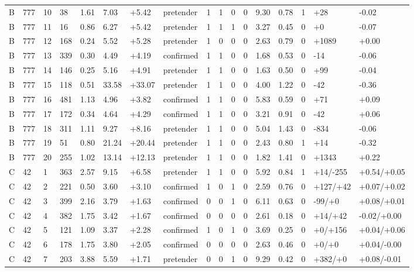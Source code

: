 \documentclass[11pt,a4paper]{article}
\begin{document}
{\begin{longtable}[]{@{}lllllllllllllllll@{}}
B & 777 & 10 & 38 & 1.61 & 7.03 & +5.42 & pretender & 1 & 1 & 0 & 0 & 9.30 & 0.78 & 1 & +28 & -0.02 \\
B & 777 & 11 & 16 & 0.86 & 6.27 & +5.42 & pretender & 1 & 1 & 1 & 0 & 3.27 & 0.45 & 0 & +0 & -0.07 \\
B & 777 & 12 & 168 & 0.24 & 5.52 & +5.28 & pretender & 1 & 0 & 0 & 0 & 2.63 & 0.79 & 0 & +1089 & +0.00 \\
B & 777 & 13 & 339 & 0.30 & 4.49 & +4.19 & confirmed & 1 & 1 & 0 & 0 & 1.68 & 0.53 & 0 & -14 & -0.06 \\
B & 777 & 14 & 146 & 0.25 & 5.16 & +4.91 & pretender & 1 & 1 & 0 & 0 & 1.63 & 0.50 & 0 & +99 & -0.04 \\
B & 777 & 15 & 118 & 0.51 & 33.58 & +33.07 & pretender & 1 & 1 & 0 & 0 & 4.00 & 1.22 & 0 & -42 & -0.36 \\
B & 777 & 16 & 481 & 1.13 & 4.96 & +3.82 & confirmed & 1 & 1 & 0 & 0 & 5.83 & 0.59 & 0 & +71 & +0.09 \\
B & 777 & 17 & 172 & 0.34 & 4.64 & +4.29 & confirmed & 1 & 1 & 0 & 0 & 3.21 & 0.91 & 0 & -42 & +0.06 \\
B & 777 & 18 & 311 & 1.11 & 9.27 & +8.16 & pretender & 1 & 1 & 0 & 0 & 5.04 & 1.43 & 0 & -834 & -0.06 \\
B & 777 & 19 & 51 & 0.80 & 21.24 & +20.44 & pretender & 1 & 1 & 0 & 0 & 2.43 & 0.80 & 1 & +14 & -0.32 \\
B & 777 & 20 & 255 & 1.02 & 13.14 & +12.13 & pretender & 1 & 1 & 0 & 0 & 1.82 & 1.41 & 0 & +1343 & +0.22 \\
C & 42 & 1 & 363 & 2.57 & 9.15 & +6.58 & pretender & 1 & 1 & 0 & 0 & 5.92 & 0.84 & 1 & +14/-255 & +0.54/+0.05 \\
C & 42 & 2 & 221 & 0.50 & 3.60 & +3.10 & confirmed & 1 & 0 & 1 & 0 & 2.59 & 0.76 & 0 & +127/+42 & +0.07/+0.02 \\
C & 42 & 3 & 399 & 2.16 & 3.79 & +1.63 & confirmed & 0 & 0 & 1 & 0 & 6.11 & 0.63 & 0 & -99/+0 & +0.08/+0.01 \\
C & 42 & 4 & 382 & 1.75 & 3.42 & +1.67 & confirmed & 0 & 0 & 0 & 0 & 2.61 & 0.18 & 0 & +14/+42 & -0.02/+0.00 \\
C & 42 & 5 & 121 & 1.09 & 3.37 & +2.28 & confirmed & 1 & 0 & 1 & 0 & 3.69 & 0.25 & 0 & +0/+156 & +0.04/+0.06 \\
C & 42 & 6 & 178 & 1.75 & 3.80 & +2.05 & confirmed & 0 & 0 & 0 & 0 & 2.63 & 0.46 & 0 & +0/+0 & +0.04/-0.00 \\
C & 42 & 7 & 203 & 3.88 & 5.59 & +1.71 & pretender & 0 & 0 & 1 & 0 & 9.29 & 0.42 & 0 & +382/+0 & +0.08/-0.01 \\

\end{longtable}}
\end{document}
